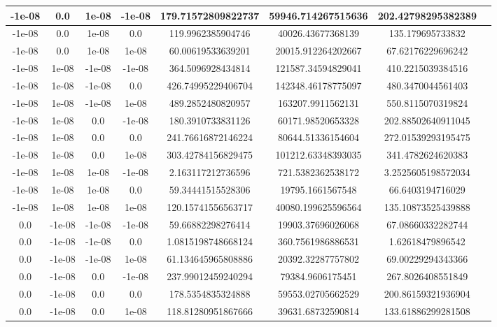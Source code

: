 \documentclass[a4paper]{article}
\begin{document}
\begin{center}
\begin{longtable}{@{}c|@{}c|@{}c|@{}c|@{}c|@{}c|@{}cX@{}}
        -1e-08 & 0.0 &1e-08 & -1e-08 & 179.71572809822737 & 59946.714267515636 & 202.42798295382389\\ \hline
        -1e-08 & 0.0 &1e-08 & 0.0 & 119.9962385904746 & 40026.43677368139 & 135.179695733832\\ \hline
        -1e-08 & 0.0 &1e-08 & 1e-08 & 60.00619533639201 & 20015.912264202667 & 67.62176229696242\\ \hline
        -1e-08 & 1e-08 & -1e-08 & -1e-08 & 364.5096928434814 & 121587.34594829041 & 410.2215039384516\\ \hline
        -1e-08 & 1e-08 & -1e-08 & 0.0 & 426.74995229406704 & 142348.46178775097 & 480.3470044561403\\ \hline
        -1e-08 & 1e-08 & -1e-08 & 1e-08 & 489.2852480820957 & 163207.9911562131 & 550.8115070319824\\ \hline
        -1e-08 & 1e-08 & 0.0 &-1e-08 & 180.3910733831126 & 60171.98520653328 & 202.88502640911045\\ \hline
        -1e-08 & 1e-08 & 0.0 &0.0 & 241.76616872146224 & 80644.51336154604 & 272.01539293195475\\ \hline
        -1e-08 & 1e-08 & 0.0 &1e-08 & 303.42784156829475 & 101212.63348393035 & 341.4782624620383\\ \hline
        -1e-08 & 1e-08 & 1e-08 & -1e-08 & 2.163117212736596 & 721.5382362538172 & 3.2525605198572034\\ \hline
        -1e-08 & 1e-08 & 1e-08 & 0.0 & 59.34441515528306 & 19795.1661567548 & 66.6403194716029\\ \hline
        -1e-08 & 1e-08 & 1e-08 & 1e-08 & 120.15741556563717 & 40080.199625596564 & 135.10873525439888\\ \hline
        0.0 &-1e-08 & -1e-08 & -1e-08 & 59.66882298276414 & 19903.37696026068 & 67.08660332282744\\ \hline
        0.0 &-1e-08 & -1e-08 & 0.0 & 1.0815198748668124 & 360.7561986886531 & 1.62618479896542\\ \hline
        0.0 &-1e-08 & -1e-08 & 1e-08 & 61.134645965808886 & 20392.32287757802 & 69.00229294343366\\ \hline
        0.0 &-1e-08 & 0.0 &-1e-08 & 237.99012459240294 & 79384.9606175451 & 267.8026408551849\\ \hline
        0.0 &-1e-08 & 0.0 &0.0 & 178.5354835324888 & 59553.02705662529 & 200.86159321936904\\ \hline
        0.0 &-1e-08 & 0.0 &1e-08 & 118.81280951867666 & 39631.68732590814 & 133.61886299281508\\ \hline

\end{longtable}
\end{center}
\end{document}
